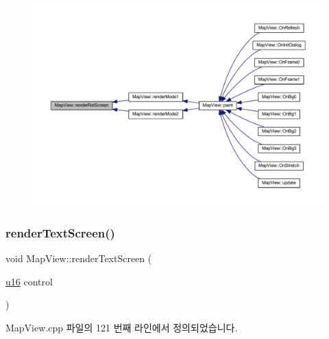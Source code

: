 \begin{figure}[H]
\begin{center}
\leavevmode
\includegraphics[width=350pt]{class_map_view_a2e462e6466f052427cd894a7c047fa68_icgraph}
\end{center}
\end{figure}
\mbox{\label{class_map_view_acff08c9c182f791799a27592ea7aafff}} 
\subsubsection{\texorpdfstring{render\+Text\+Screen()}{renderTextScreen()}}
{\footnotesize\ttfamily void Map\+View\+::render\+Text\+Screen (\begin{DoxyParamCaption}\item[{\mbox{\hyperlink{_system_8h_a9e6c91d77e24643b888dbd1a1a590054}{u16}}}]{control }\end{DoxyParamCaption})}



Map\+View.\+cpp 파일의 121 번째 라인에서 정의되었습니다.


